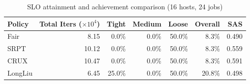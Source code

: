 \begin{table}[t]
\centering
\caption{SLO attainment and achievement comparison (16 hosts, 24 jobs)}
\label{tab:slo_16host}
\begin{tabular}{l|r|r|r|r|r|r}
\hline
Policy & Total Iters ($\times 10^4$) & Tight & Medium & Loose & Overall & SAS \\
\hline
Fair & 8.15 & 0.0\% & 0.0\% & 50.0\% & 8.3\% & 0.490 \\
SRPT & 10.12 & 0.0\% & 0.0\% & 50.0\% & 8.3\% & 0.559 \\
CRUX & 10.47 & 0.0\% & 0.0\% & 50.0\% & 8.3\% & 0.591 \\
LongLiu & 6.45 & 25.0\% & 0.0\% & 50.0\% & 20.8\% & 0.498 \\
\hline
\end{tabular}
\end{table}
